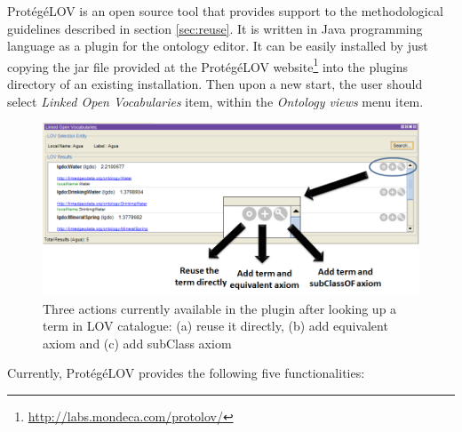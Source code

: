 Prot{\'e}g{\'e}LOV is an open source tool that provides support to the methodological guidelines described in section \ref{sec:reuse}. It is written in Java programming language as a plugin for the \protege ontology editor. It can be easily installed by just copying the jar file provided at the Prot{\'e}g{\'e}LOV website\footnote{\url{http://labs.mondeca.com/protolov/}} into the plugins directory of an existing \protege installation. Then upon a new start, the user should select \emph{Linked Open Vocabularies} item, within the \emph{Ontology views} menu item.

\begin{figure}[!bht]
\center
\includegraphics[scale=0.5]{img/LOVOptions.png}
\caption{Three actions currently available in the plugin after looking up a term in LOV catalogue: (a) reuse it directly, (b) add equivalent axiom and (c) add subClass axiom}
\label{fig:LOVoptions}
\end{figure}

Currently, Prot{\'e}g{\'e}LOV provides the following five functionalities: 

